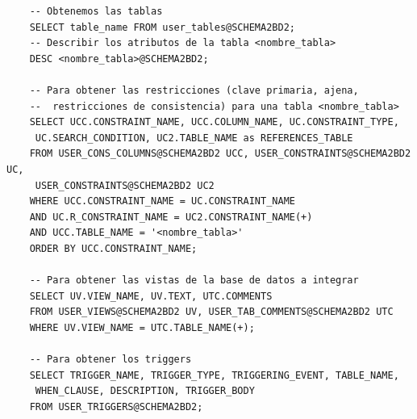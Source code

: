 \documentclass{article}
\begin{document}
\begin{lstlisting}
	-- Obtenemos las tablas
	SELECT table_name FROM user_tables@SCHEMA2BD2;
	-- Describir los atributos de la tabla <nombre_tabla>
	DESC <nombre_tabla>@SCHEMA2BD2;

	-- Para obtener las restricciones (clave primaria, ajena,
	--  restricciones de consistencia) para una tabla <nombre_tabla>
	SELECT UCC.CONSTRAINT_NAME, UCC.COLUMN_NAME, UC.CONSTRAINT_TYPE, 
	 UC.SEARCH_CONDITION, UC2.TABLE_NAME as REFERENCES_TABLE
	FROM USER_CONS_COLUMNS@SCHEMA2BD2 UCC, USER_CONSTRAINTS@SCHEMA2BD2 UC,
	 USER_CONSTRAINTS@SCHEMA2BD2 UC2
	WHERE UCC.CONSTRAINT_NAME = UC.CONSTRAINT_NAME
	AND UC.R_CONSTRAINT_NAME = UC2.CONSTRAINT_NAME(+)
	AND UCC.TABLE_NAME = '<nombre_tabla>'
	ORDER BY UCC.CONSTRAINT_NAME;
	
	-- Para obtener las vistas de la base de datos a integrar
	SELECT UV.VIEW_NAME, UV.TEXT, UTC.COMMENTS
	FROM USER_VIEWS@SCHEMA2BD2 UV, USER_TAB_COMMENTS@SCHEMA2BD2 UTC
	WHERE UV.VIEW_NAME = UTC.TABLE_NAME(+);
	
	-- Para obtener los triggers
	SELECT TRIGGER_NAME, TRIGGER_TYPE, TRIGGERING_EVENT, TABLE_NAME,
	 WHEN_CLAUSE, DESCRIPTION, TRIGGER_BODY
	FROM USER_TRIGGERS@SCHEMA2BD2;
\end{lstlisting}
\end{document}
